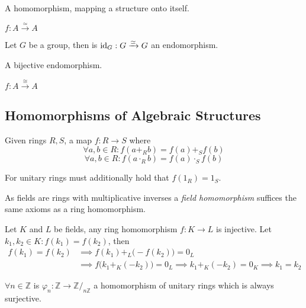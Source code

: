 \begin{definition}[Endomorphism]
   A homomorphism, mapping a structure onto itself.
\end{definition}
\begin{remark}[Notation]
   \(f: A \xrightarrow{\simeq} A\)
\end{remark}
\begin{example}
   Let \(G\) be a group, then is \(\operatorname{id}_G: G \xrightarrow{\simeq} G\) an endomorphism.
\end{example}

\begin{definition}[Automorphism]
   A bijective endomorphism.
\end{definition}
\begin{remark}[Notation]
   \(f: A \xrightarrow{\cong} A\)
\end{remark}

\subsection{Homomorphisms of Algebraic Structures}
\begin{definition}\label{def:ring_homo}
   Given rings \(R, S\), a map \(f: R \to S\) where
   \[\forall a, b \in R: f(a +_R b) = f(a) +_S f(b)\]
   \[\forall a, b \in R: f(a \cdot_R b) = f(a) \cdot_S f(b)\]
\end{definition}
\begin{remark}
   For unitary rings must additionally hold that \(f(1_R) = 1_S\).
\end{remark}
\begin{remark}
   As fields are rings with multiplicative inverses a \emph{field homomorphism} suffices the same axioms as a ring homomorphism.
\end{remark}
\begin{remark}
   Let \(K\) and \(L\) be fields, any ring homomorphism \(f: K \to L\) is injective.
   Let \(k_1, k_2 \in K: f(k_1) = f(k_2)\), then
   \begin{equation*}
      \begin{split}
         f(k_1) = f(k_2) & \implies f(k_1) +_L \big(-f(k_2)\big) = 0_L \\
                         & \implies f\big(k_1 +_K (-k_2)\big) = 0_L \implies k_1 +_K (-k_2) = 0_K \implies k_1 = k_2
      \end{split}
   \end{equation*}
\end{remark}
\begin{example}
   \(\forall n \in \mathbb{Z}\) is \(\varphi_n: \mathbb{Z} \to \mathbb{Z}/_{n\mathbb{Z}}\) a homomorphism of unitary rings which is always surjective.
\end{example}

